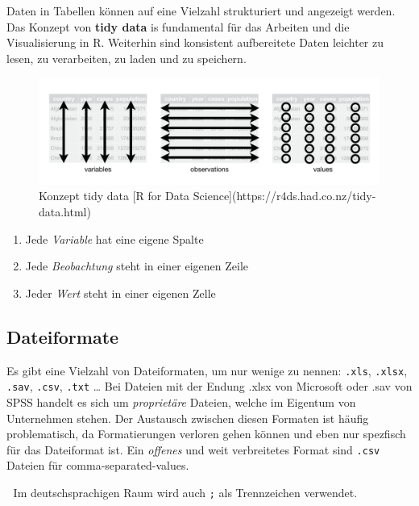 \documentclass[
]{article}
\providecommand{\tightlist}{%
  \setlength{\itemsep}{0pt}\setlength{\parskip}{0pt}}
\begin{document}
Daten in Tabellen können auf eine Vielzahl strukturiert und angezeigt werden. Das Konzept von \textbf{tidy data} is fundamental für das Arbeiten und die Visualisierung in R. Weiterhin sind konsistent aufbereitete Daten leichter zu lesen, zu verarbeiten, zu laden und zu speichern.

\begin{figure}

{\centering \includegraphics[width=26.67in]{images/021} 

}

\caption{Konzept tidy data [R for Data Science](https://r4ds.had.co.nz/tidy-data.html)}\label{fig:unnamed-chunk-102}
\end{figure}

\begin{enumerate}
\def\labelenumi{\arabic{enumi}.}
\tightlist
\item
  Jede \emph{Variable} hat eine eigene Spalte
\item
  Jede \emph{Beobachtung} steht in einer eigenen Zeile
\item
  Jeder \emph{Wert} steht in einer eigenen Zelle
\end{enumerate}

\hypertarget{dateiformate}{%
\subsection{Dateiformate}\label{dateiformate}}

Es gibt eine Vielzahl von Dateiformaten, um nur wenige zu nennen: \texttt{.xls}, \texttt{.xlsx}, \texttt{.sav}, \texttt{.csv}, \texttt{.txt} \ldots{}
Bei Dateien mit der Endung .xlsx von Microsoft oder .sav von SPSS handelt es sich um \emph{proprietäre} Dateien, welche im Eigentum von Unternehmen stehen. Der Austausch zwischen diesen Formaten ist häufig problematisch, da Formatierungen verloren gehen können und eben nur spezfisch für das Dateiformat ist. Ein \emph{offenes} und weit verbreitetes Format sind \texttt{.csv} Dateien für comma-separated-values.

🚨 Im deutschsprachigen Raum wird auch \texttt{;} als Trennzeichen verwendet.
\end{document}
